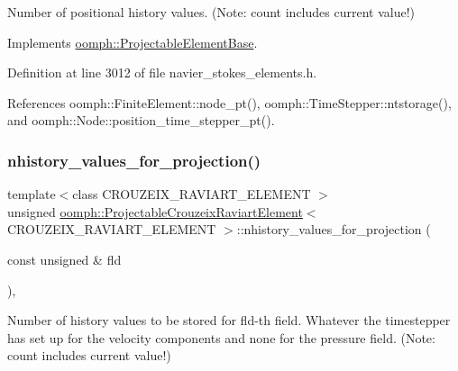 Number of positional history values. (Note\+: count includes current value!) 



Implements \hyperlink{classoomph_1_1ProjectableElementBase_ab4ecd0cd24000a3ed675dc7198203c1f}{oomph\+::\+Projectable\+Element\+Base}.



Definition at line 3012 of file navier\+\_\+stokes\+\_\+elements.\+h.



References oomph\+::\+Finite\+Element\+::node\+\_\+pt(), oomph\+::\+Time\+Stepper\+::ntstorage(), and oomph\+::\+Node\+::position\+\_\+time\+\_\+stepper\+\_\+pt().

\mbox{\label{classoomph_1_1ProjectableCrouzeixRaviartElement_aa86ac441dc201801e0d96c634cb4e251}} 
\subsubsection{\texorpdfstring{nhistory\+\_\+values\+\_\+for\+\_\+projection()}{nhistory\_values\_for\_projection()}}
{\footnotesize\ttfamily template$<$class C\+R\+O\+U\+Z\+E\+I\+X\+\_\+\+R\+A\+V\+I\+A\+R\+T\+\_\+\+E\+L\+E\+M\+E\+NT $>$ \\
unsigned \hyperlink{classoomph_1_1ProjectableCrouzeixRaviartElement}{oomph\+::\+Projectable\+Crouzeix\+Raviart\+Element}$<$ C\+R\+O\+U\+Z\+E\+I\+X\+\_\+\+R\+A\+V\+I\+A\+R\+T\+\_\+\+E\+L\+E\+M\+E\+NT $>$\+::nhistory\+\_\+values\+\_\+for\+\_\+projection (\begin{DoxyParamCaption}\item[{const unsigned \&}]{fld }\end{DoxyParamCaption})\hspace{0.3cm}{\ttfamily [inline]}, {\ttfamily [virtual]}}



Number of history values to be stored for fld-\/th field. Whatever the timestepper has set up for the velocity components and none for the pressure field. (Note\+: count includes current value!) 



